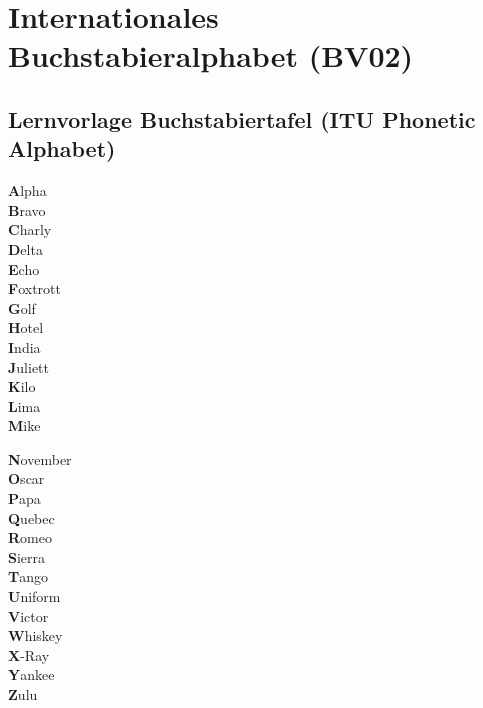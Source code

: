 \graphicspath{{bv02_Buchstabieren+Funken/}}

   \chapter{Internationales Buchstabieralphabet (BV02)}


\section{Lernvorlage Buchstabiertafel (ITU Phonetic Alphabet)}

\begin{minipage}[t]{0.5\textwidth}
  \large
  \textbf{A}lpha\\
  \textbf{B}ravo\\
  \textbf{C}harly\\
  \textbf{D}elta\\
  \textbf{E}cho\\
  \textbf{F}oxtrott\\
  \textbf{G}olf\\
  \textbf{H}otel\\
  \textbf{I}ndia\\
  \textbf{J}uliett\\
  \textbf{K}ilo\\
  \textbf{L}ima\\
  \textbf{M}ike\\
\end{minipage}
\begin{minipage}[t]{0.5\textwidth}
  \large
  \textbf{N}ovember\\
  \textbf{O}scar\\
  \textbf{P}apa\\
  \textbf{Q}uebec\\
  \textbf{R}omeo\\
  \textbf{S}ierra\\
  \textbf{T}ango\\
  \textbf{U}niform\\
  \textbf{V}ictor\\
  \textbf{W}hiskey\\
  \textbf{X}-Ray\\
  \textbf{Y}ankee\\
  \textbf{Z}ulu\\
\end{minipage}


